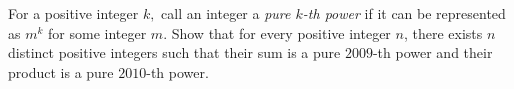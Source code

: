 For a positive integer $k,$ call an integer a \emph{pure $k$-th power} if it can be represented as $m^k$ for some integer $m$. Show that for every positive integer $n$, there exists $n$ distinct positive integers such that their sum is a pure $2009$-th power and their product is a pure $2010$-th power.